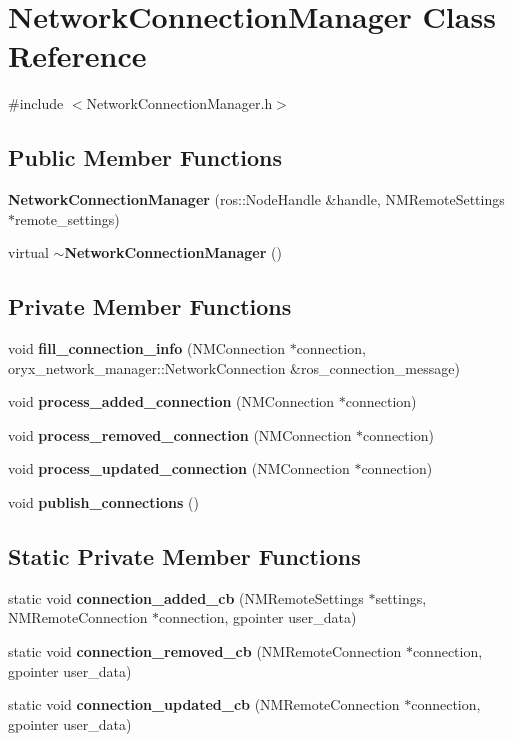 \section{\-Network\-Connection\-Manager \-Class \-Reference}
\label{classNetworkConnectionManager}


{\ttfamily \#include $<$\-Network\-Connection\-Manager.\-h$>$}

\subsection*{\-Public \-Member \-Functions}
\begin{DoxyCompactItemize}
\item 
{\bf \-Network\-Connection\-Manager} (ros\-::\-Node\-Handle \&handle, \-N\-M\-Remote\-Settings $\ast$remote\-\_\-settings)
\item 
virtual {\bf $\sim$\-Network\-Connection\-Manager} ()
\end{DoxyCompactItemize}
\subsection*{\-Private \-Member \-Functions}
\begin{DoxyCompactItemize}
\item 
void {\bf fill\-\_\-connection\-\_\-info} (\-N\-M\-Connection $\ast$connection, oryx\-\_\-network\-\_\-manager\-::\-Network\-Connection \&ros\-\_\-connection\-\_\-message)
\item 
void {\bf process\-\_\-added\-\_\-connection} (\-N\-M\-Connection $\ast$connection)
\item 
void {\bf process\-\_\-removed\-\_\-connection} (\-N\-M\-Connection $\ast$connection)
\item 
void {\bf process\-\_\-updated\-\_\-connection} (\-N\-M\-Connection $\ast$connection)
\item 
void {\bf publish\-\_\-connections} ()
\end{DoxyCompactItemize}
\subsection*{\-Static \-Private \-Member \-Functions}
\begin{DoxyCompactItemize}
\item 
static void {\bf connection\-\_\-added\-\_\-cb} (\-N\-M\-Remote\-Settings $\ast$settings, \-N\-M\-Remote\-Connection $\ast$connection, gpointer user\-\_\-data)
\item 
static void {\bf connection\-\_\-removed\-\_\-cb} (\-N\-M\-Remote\-Connection $\ast$connection, gpointer user\-\_\-data)
\item 
static void {\bf connection\-\_\-updated\-\_\-cb} (\-N\-M\-Remote\-Connection $\ast$connection, gpointer user\-\_\-data)
\end{DoxyCompactItemize}
